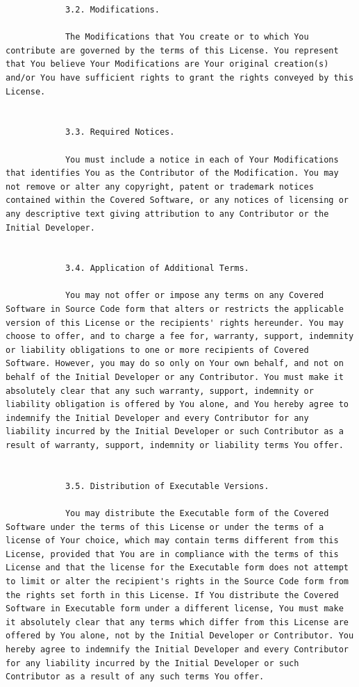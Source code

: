 \documentclass[10pt, headsepline,DIV14,BCOR0.5cm]{scrreprt}
\begin{document}
\begin{lstlisting}
            3.2. Modifications.

            The Modifications that You create or to which You contribute are governed by the terms of this License. You represent that You believe Your Modifications are Your original creation(s) and/or You have sufficient rights to grant the rights conveyed by this License.
            

            3.3. Required Notices.

            You must include a notice in each of Your Modifications that identifies You as the Contributor of the Modification. You may not remove or alter any copyright, patent or trademark notices contained within the Covered Software, or any notices of licensing or any descriptive text giving attribution to any Contributor or the Initial Developer.
            

            3.4. Application of Additional Terms.

            You may not offer or impose any terms on any Covered Software in Source Code form that alters or restricts the applicable version of this License or the recipients' rights hereunder. You may choose to offer, and to charge a fee for, warranty, support, indemnity or liability obligations to one or more recipients of Covered Software. However, you may do so only on Your own behalf, and not on behalf of the Initial Developer or any Contributor. You must make it absolutely clear that any such warranty, support, indemnity or liability obligation is offered by You alone, and You hereby agree to indemnify the Initial Developer and every Contributor for any liability incurred by the Initial Developer or such Contributor as a result of warranty, support, indemnity or liability terms You offer.
            

            3.5. Distribution of Executable Versions.

            You may distribute the Executable form of the Covered Software under the terms of this License or under the terms of a license of Your choice, which may contain terms different from this License, provided that You are in compliance with the terms of this License and that the license for the Executable form does not attempt to limit or alter the recipient's rights in the Source Code form from the rights set forth in this License. If You distribute the Covered Software in Executable form under a different license, You must make it absolutely clear that any terms which differ from this License are offered by You alone, not by the Initial Developer or Contributor. You hereby agree to indemnify the Initial Developer and every Contributor for any liability incurred by the Initial Developer or such Contributor as a result of any such terms You offer.
            


\end{lstlisting}
\end{document}
